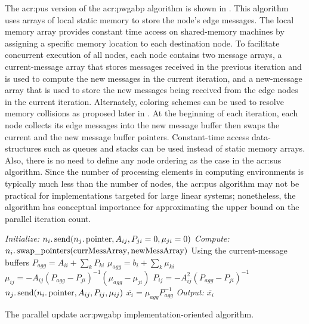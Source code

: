 The \gls{acr:pus} version of the \gls{acr:pwgabp} algorithm is shown in .
This algorithm uses arrays of local static memory to store the node's edge messages.
The local memory array provides constant time access on shared-memory machines by assigning a specific memory location to each destination node.
To facilitate concurrent execution of all nodes, each node contains two message arrays, a current-message array that stores messages received in the previous iteration and is used to compute the new messages in the current iteration, and a new-message array that is used to store the new messages being received from the edge nodes in the current iteration.
Alternately, coloring schemes can be used to resolve memory collisions as proposed later in .
At the beginning of each iteration, each node collects its edge messages into the new message buffer then swaps the current and the new message buffer pointers.
Constant-time access data-structures such as queues and stacks can be used instead of static memory arrays.
Also, there is no need to define any node ordering as the case in the \gls{acr:sus} algorithm.
Since the number of processing elements in computing environments is typically much less than the number of nodes, the \gls{acr:pus} algorithm may not be practical for implementations targeted for large linear systems; nonetheless, the algorithm has conceptual importance for approximating the upper bound on the parallel iteration count.

\begin{algorithm}[h]
	\centering
	\begin{algorithmic}[1]
		\STATE \textit{Initialize:}
		\STATE $n_i. \operatorname{send} (n_j. \operatorname{pointer} ,A_{ij}, P_{ji} = 0, \mu_{ji} = 0)$
		\AlgENDFOR
		\STATE \textit{Compute: }
		\REPEAT[iterations]
		\STATE $n_i. \operatorname{swap\_pointers} ( \operatorname{currMessArray} , \operatorname{newMessArray} )$
		\AlgENDFOR
		\STATE Using the current-message buffers
		\STATE $ P_{agg} = A_{ii} + \sum_k P_{ki}$
		\STATE $ \mu_{agg} = b_{i} + \sum_k \mu_{ki}$
		\STATE $\mu_{ij} = -A_{ij} (P_{agg} - P_{ji})^{-1} (\mu_{agg} - \mu_{ji}) $
		\STATE $P_{ij} = -A_{ij}^2 (P_{agg} - P_{ji})^{-1} $
		\STATE $n_j. \operatorname{send} (n_i. \operatorname{pointer} ,A_{ij}, P_{ij}, \mu_{ij})$
		\AlgENDFOR
		\STATE $\overline{x_i} = \mu_{agg} P_{agg}^{-1}$
		\AlgENDFOR
		\STATE \textit{Output:} $\overline{x_{i}}$
	\end{algorithmic}
	\caption{The parallel update \acrshort{acr:pwgabp} implementation-oriented algorithm.}
	\label{alg:par_gabp}
\end{algorithm}


